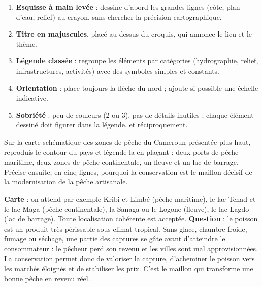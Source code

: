 \documentclass[11pt]{article}
\begin{document}
\begin{methode}
\begin{enumerate}
\item \textbf{Esquisse à main levée} : dessine d'abord les grandes lignes (côte, plan d'eau, relief) au crayon, sans chercher la précision cartographique.
\item \textbf{Titre en majuscules}, placé au-dessus du croquis, qui annonce le lieu et le thème.
\item \textbf{Légende classée} : regroupe les éléments par catégories (hydrographie, relief, infrastructures, activités) avec des symboles simples et constants.
\item \textbf{Orientation} : place toujours la flèche du nord ; ajoute si possible une échelle indicative.
\item \textbf{Sobriété} : peu de couleurs (2 ou 3), pas de détails inutiles ; chaque élément dessiné doit figurer dans la légende, et réciproquement.
\end{enumerate}
\end{methode}

\begin{exercice}
Sur la carte schématique des zones de pêche du Cameroun présentée plus haut, reproduis le contour du pays et légende-la en plaçant : deux ports de pêche maritime, deux zones de pêche continentale, un fleuve et un lac de barrage. Précise ensuite, en cinq lignes, pourquoi la conservation est le maillon décisif de la modernisation de la pêche artisanale.
\end{exercice}

\begin{corrige}[Exercice]
\textbf{Carte} : on attend par exemple Kribi et Limbé (pêche maritime), le lac Tchad et le lac Maga (pêche continentale), la Sanaga ou le Logone (fleuve), le lac Lagdo (lac de barrage). Toute localisation cohérente est acceptée.
\textbf{Question} : le poisson est un produit très périssable sous climat tropical. Sans glace, chambre froide, fumage ou séchage, une partie des captures se gâte avant d'atteindre le consommateur : le pêcheur perd son revenu et les villes sont mal approvisionnées. La conservation permet donc de valoriser la capture, d'acheminer le poisson vers les marchés éloignés et de stabiliser les prix. C'est le maillon qui transforme une bonne pêche en revenu réel.
\end{corrige}
\end{document}
